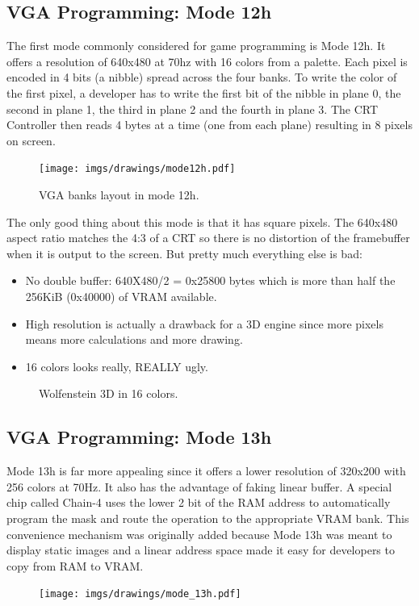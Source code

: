 \documentclass[book.tex]{subfiles}
\begin{document}
 \subsection{VGA Programming: Mode 12h}
 The first mode commonly considered for game programming is Mode 12h. It offers a resolution of 640x480 at 70hz with 16 colors from a palette. Each pixel is encoded in 4 bits (a nibble) spread across the four banks. To write the color of the first pixel, a developer has to write the first bit of the nibble in plane 0, the second in plane 1, the third in plane 2 and the fourth in plane 3. The CRT Controller then reads 4 bytes at a time (one from each plane) resulting in 8 pixels on screen.\\
\par
\begin{figure}[H]
\centering
 \texttt{[image: imgs/drawings/mode12h.pdf]}
\caption{VGA banks layout in mode 12h.}
\end{figure}
\par

The only good thing about this mode is that it has square pixels. The 640x480 aspect ratio matches the 4:3 of a CRT so there is no distortion of the framebuffer when it is output to the screen. But pretty much everything else is bad:\\
\begin{itemize}
\item No double buffer: 640X480/2 = 0x25800 bytes which is more than half the 256KiB (0x40000) of VRAM available.
\item High resolution is actually a drawback for a 3D engine since more pixels means more calculations and more drawing.
\item 16 colors looks really, REALLY ugly.
\end{itemize}

 \begin{figure}[H]
\centering
 \caption{Wolfenstein 3D in 16 colors.}
\end{figure}





 
  \subsection{VGA Programming: Mode 13h}
  Mode 13h is far more appealing since it offers a lower resolution of 320x200 with 256 colors at 70Hz. It also has the advantage of faking linear buffer. A special chip called Chain-4 uses the lower 2 bit of the RAM address to automatically program the mask and route the operation to the appropriate VRAM bank. This convenience mechanism was originally added because Mode 13h was meant to display static images and a linear address space made it easy for developers to copy from RAM to VRAM.\\
  \par
 \begin{figure}[H]
\centering
      \texttt{[image: imgs/drawings/mode\_13h.pdf]}
\end{figure}
\par
\end{document}
